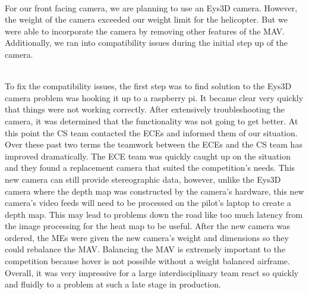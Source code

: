 \documentclass[onecolumn, oneside, letterpaper, draftclsnofoot, 10pt, compsoc]{IEEEtran}
\begin{document}
\noindent \\
For our front facing camera, we are planning to use an Eys3D camera. However, the weight of the camera exceeded our weight limit for the helicopter. But we were able to incorporate the camera by removing other features of the MAV. Additionally, we ran into compatibility issues during the initial step up of the camera.

\noindent \\
To fix the compatibility issues, the first step was to find solution to the Eys3D camera problem was hooking it up to a raspberry pi. It became clear very quickly that things were not working correctly. After extensively troubleshooting the camera, it was determined that the functionality was not going to get better. At this point the CS team contacted the ECEs and informed them of our situation. Over these past two terms the teamwork between the ECEs and the CS team has improved dramatically. The ECE team was quickly caught up on the situation and they found a replacement camera that suited the competition's needs. This new camera can still provide stereographic data, however, unlike the Eys3D camera where the depth map was constructed by the camera's hardware, this new camera's video feeds will need to be processed on the pilot's laptop to create a depth map. This may lead to problems down the road like too much latency from the image processing for the heat map to be useful. After the new camera was ordered, the MEs were given the new camera's weight and dimensions so they could rebalance the MAV. Balancing the MAV is extremely important to the competition because hover is not possible without a weight balanced airframe. Overall, it was very impressive for a large interdisciplinary team react so quickly and fluidly to a problem at such a late stage in production.



\end{document}
